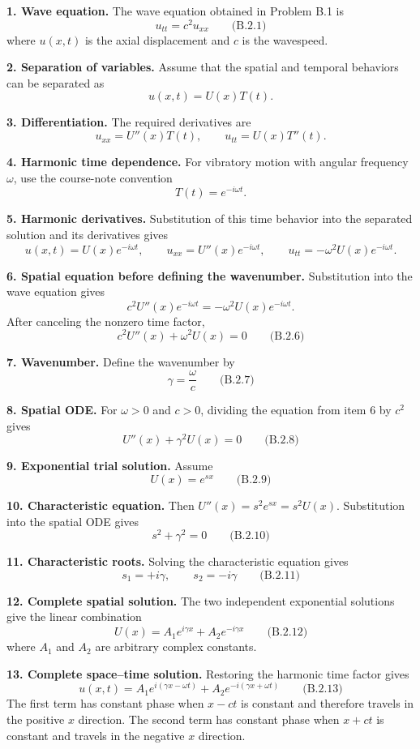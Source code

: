 \textbf{1. Wave equation.} The wave equation obtained in Problem B.1 is
\[
\boxed{u_{tt}=c^2u_{xx}}\qquad\text{(B.2.1)}
\]
where $u(x,t)$ is the axial displacement and $c$ is the wavespeed.

\textbf{2. Separation of variables.} Assume that the spatial and temporal behaviors can be separated as
\[
u(x,t)=U(x)T(t).
\]

\textbf{3. Differentiation.} The required derivatives are
\[
u_{xx}=U''(x)T(t),
\qquad
u_{tt}=U(x)T''(t).
\]

\textbf{4. Harmonic time dependence.} For vibratory motion with angular frequency $\omega$, use the course-note convention
\[
T(t)=e^{-i\omega t}.
\]

\textbf{5. Harmonic derivatives.} Substitution of this time behavior into the separated solution and its derivatives gives
\[
u(x,t)=U(x)e^{-i\omega t},
\qquad
u_{xx}=U''(x)e^{-i\omega t},
\qquad
u_{tt}=-\omega^2U(x)e^{-i\omega t}.
\]

\textbf{6. Spatial equation before defining the wavenumber.} Substitution into the wave equation gives
\[
c^2U''(x)e^{-i\omega t}=-\omega^2U(x)e^{-i\omega t}.
\]
After canceling the nonzero time factor,
\[
\boxed{c^2U''(x)+\omega^2U(x)=0}\qquad\text{(B.2.6)}
\]

\textbf{7. Wavenumber.} Define the wavenumber by
\[
\boxed{\gamma=\frac{\omega}{c}}\qquad\text{(B.2.7)}
\]

\textbf{8. Spatial ODE.} For $\omega>0$ and $c>0$, dividing the equation from item 6 by $c^2$ gives
\[
\boxed{U''(x)+\gamma^2U(x)=0}\qquad\text{(B.2.8)}
\]

\textbf{9. Exponential trial solution.} Assume
\[
U(x)=e^{s x}\qquad\text{(B.2.9)}
\]

\textbf{10. Characteristic equation.} Then $U''(x)=s^2e^{s x}=s^2U(x)$. Substitution into the spatial ODE gives
\[
\boxed{s^2+\gamma^2=0}\qquad\text{(B.2.10)}
\]

\textbf{11. Characteristic roots.} Solving the characteristic equation gives
\[
\boxed{s_1=+i\gamma,\qquad s_2=-i\gamma}\qquad\text{(B.2.11)}
\]

\textbf{12. Complete spatial solution.} The two independent exponential solutions give the linear combination
\[
\boxed{U(x)=A_1e^{i\gamma x}+A_2e^{-i\gamma x}}\qquad\text{(B.2.12)}
\]
where $A_1$ and $A_2$ are arbitrary complex constants.

\textbf{13. Complete space--time solution.} Restoring the harmonic time factor gives
\[
\boxed{
u(x,t)=A_1e^{i(\gamma x-\omega t)}+A_2e^{-i(\gamma x+\omega t)}
}\qquad\text{(B.2.13)}
\]
The first term has constant phase when $x-ct$ is constant and therefore travels in the positive $x$ direction. The second term has constant phase when $x+ct$ is constant and travels in the negative $x$ direction.

